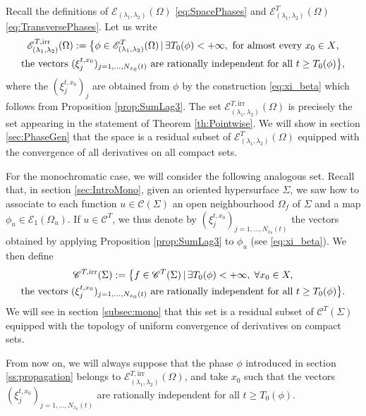 \documentclass[JEP,XML,SOM,Unicode,published]{cedram}
\let\mathcal\mathscr
\newcommand{\irr}{\mathrm{irr}}
\theoremstyle{plain}
\theoremstyle{definition}
\begin{document}
Recall the definitions of $\mathcal{E}_{(\lambda_1,\lambda_2)}(\Omega)$ \eqref{eq:SpacePhases} and $\mathcal{E}^{T}_{(\lambda_1,\lambda_2)}(\Omega)$ \eqref{eq:TransversePhases}. Let us write\vspace*{-8pt}
\begin{multline}\label{eq:DefIrr}
\mathcal{E}^{T, \irr}_{(\lambda_1,\lambda_2)}(\Omega):=\big{\{} \phi \in \mathcal{E}^T_{(\lambda_1,\lambda_2)}(\Omega)\, |\, \exists T_0(\phi)<+\infty, \text{ for almost every $x_0\in X$,}\\
\text{the vectors $(\xi_j^{t,x_0})_{j=1,\dots,N_{x_0}(t)}$ are rationally independent for all $t\geq T_0(\phi)$}\big{\}},
\end{multline}
where the $(\xi_j^{t,x_0})_j$ are obtained from $\phi$ by the construction \eqref{eq:xi_beta} which follows from Proposition \ref{prop:SumLag3}. The set $\mathcal{E}^{T, \irr}_{(\lambda_1,\lambda_2)}(\Omega)$ is precisely the set appearing in the statement of Theorem \ref{th:Pointwise}. We will show in section \ref{sec:PhaseGen} that the space is a residual subset of $\mathcal{E}^{T}_{(\lambda_1,\lambda_2)}(\Omega)$ equipped with the convergence of all derivatives on all compact sets.

For the monochromatic case, we will consider the following analogous set. Recall that, in section \ref{sec:IntroMono}, given an oriented hypersurface $\Sigma$, we saw how to associate to each function $u\in \mathcal{C}(\Sigma)$ an open neighbourhood $\Omega_f$ of $\Sigma$ and a map $\phi_u \in \mathcal{E}_1(\Omega_u)$. If $u\in \mathcal{C}^T$, we thus denote by $(\xi_j^{t,x_0})_{j=1,\dots,N_{x_0}(t)}$ the vectors obtained by applying Proposition \ref{prop:SumLag3} to $\phi_u$ (see \eqref{eq:xi_beta}).
We then define
\begin{multline}\label{eq:DefGeneMono}
\mathcal{C}^{T,\irr}(\Sigma) := \big{\{} f\in \mathcal{C}^T(\Sigma) \, |\, \exists T_0(\phi)<+\infty,\; \forall x_0\in X,\\ \text{the vectors $(\xi_j^{t,x_0})_{j=1,\dots,N_{x_0}(t)}$ are rationally independent for all $t\geq T_0(\phi)$}\big{\}}.
\end{multline}
We will see in section \ref{subsec:mono} that this set is a residual subset of $\mathcal{C}^{T}(\Sigma) $ equipped with the topology of uniform convergence of derivatives on compact sets.

From now on, we will always suppose that the phase $\phi$ introduced in section \ref{ss:propagation} \hbox{belongs} to $\mathcal{E}^{T,\irr}_{(\lambda_1,\lambda_2)}(\Omega)$, and take $x_0$ such that the vectors $(\xi_j^{t,x_0})_{j=1,\dots,N_{x_0}(t)}$ are rationally independent for all $t\geq T_0(\phi)$.
\end{document}
